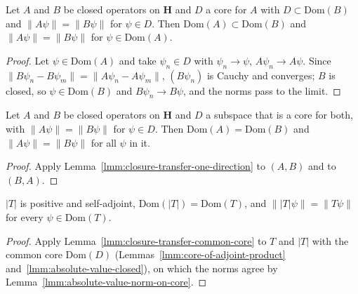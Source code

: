 \begin{lemma}
    \label{lmm:closure-transfer-one-direction}
    \leanok
    Let $A$ and $B$ be closed operators on $\mathbf{H}$ and $D$ a core for $A$ with $D \subset \text{Dom}(B)$ and $\|A\psi\| = \|B\psi\|$ for $\psi \in D$. Then $\text{Dom}(A) \subset \text{Dom}(B)$ and $\|A\psi\| = \|B\psi\|$ for $\psi \in \text{Dom}(A)$.
\end{lemma}
\begin{proof}
    \leanok
    Let $\psi \in \text{Dom}(A)$ and take $\psi_n \in D$ with $\psi_n \to \psi$, $A\psi_n \to A\psi$. Since $\|B\psi_n - B\psi_m\| = \|A\psi_n - A\psi_m\|$, $(B\psi_n)$ is Cauchy and converges; $B$ is closed, so $\psi \in \text{Dom}(B)$ and $B\psi_n \to B\psi$, and the norms pass to the limit.
\end{proof}

\begin{lemma}
    \label{lmm:closure-transfer-common-core}
    \leanok
    Let $A$ and $B$ be closed operators on $\mathbf{H}$ and $D$ a subspace that is a core for both, with $\|A\psi\| = \|B\psi\|$ for $\psi \in D$. Then $\text{Dom}(A) = \text{Dom}(B)$ and $\|A\psi\| = \|B\psi\|$ for all $\psi$ in it.
\end{lemma}
\begin{proof}
    \leanok
    Apply Lemma~\ref{lmm:closure-transfer-one-direction} to $(A, B)$ and to $(B, A)$.
\end{proof}

\begin{theorem}
    \label{thrm:absolute-value-domain}
    \leanok
    $|T|$ is positive and self-adjoint, $\text{Dom}(|T|) = \text{Dom}(T)$, and $\||T|\psi\| = \|T\psi\|$ for every $\psi \in \text{Dom}(T)$.
\end{theorem}
\begin{proof}
    \leanok
    Apply Lemma~\ref{lmm:closure-transfer-common-core} to $T$ and $|T|$ with the common core $\text{Dom}(D)$ (Lemmas~\ref{lmm:core-of-adjoint-product} and~\ref{lmm:absolute-value-closed}), on which the norms agree by Lemma~\ref{lmm:absolute-value-norm-on-core}.
\end{proof}

